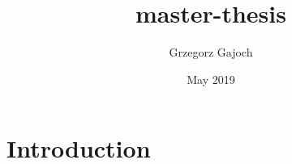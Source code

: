 \documentclass{article}
\title{master-thesis}
\author{Grzegorz Gajoch}
\date{May 2019}
\begin{document}
\maketitle

\section{Introduction}
\end{document}
